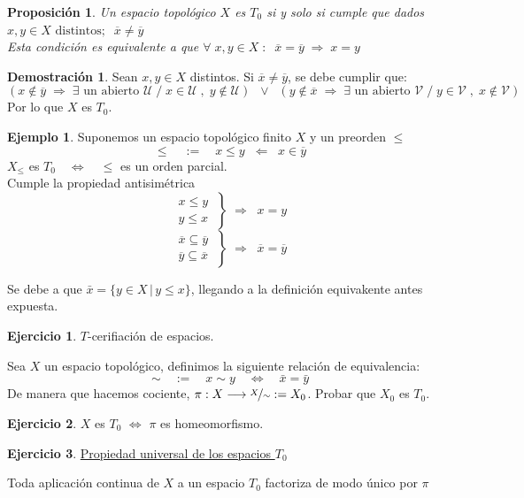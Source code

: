 \documentclass[12pt,twoside]{report}
\theoremstyle{azul}
\theoremstyle{azul2}
\theoremstyle{plain}
\newtheorem*{prop}{Proposición}
\theoremstyle{definition}
\newtheorem*{eje}{Ejemplo}
\newtheorem*{dem}{Demostración}
\newtheorem*{ejer}{Ejercicio}
\theoremstyle{remark}
\begin{document}
\begin{prop}
Un espacio topológico $X$ es $T_0$ si y solo si cumple que dados $x, y \in X \text{ distintos};\;\; \overline x \neq \overline y$\\
Esta condición es equivalente a que $\forall \; x, y \in X \; : \;\; \overline x = \overline y \; \Rightarrow \; x = y$
\end{prop}
\begin{dem}
Sean $x, y \in X$ distintos. Si $\overline{x} \neq \overline{y}$, se debe cumplir que:
$$(x \not\in \overline{y} \; \Rightarrow \; \exists \text{ un abierto } \mathcal{U}\; / \; x \in \mathcal{U} \; , \; y \nin \mathcal{U})\;\; \lor\;\; (y \nin \overline{x} \; \Rightarrow\; \exists \text{ un abierto } \mathcal{V}\; / \; y \in \mathcal{V} \; , \; x \not\in \mathcal{V})$$
Por lo que $X$ es $T_0$.
\end{dem}
\begin{eje}
Suponemos un espacio topológico finito $X$ y un preorden $\leq$
$$\leq \quad := \quad x \leq y \;\; \Leftarrow \; \; x \in \overline{y}$$
$X_{\leq}$ es $T_0 \quad \Leftrightarrow \quad \leq$ es un orden parcial.\vspace{5mm}\\
Cumple la propiedad antisimétrica
\vspace{-2mm}
$$\left. \begin{array}{c}
x \leq y \: \\
y \leq x \; \end{array} \right\} \; \Rightarrow \; \; x = y $$
$$ \left. \begin{array}{c}
\overline{x} \subseteq \overline{y}\; \\
\overline{y} \subseteq \overline{x}\; \end{array}\right\} \; \Rightarrow \; \; \overline{x} = \overline{y} $$

Se debe a que $\bar{x}=\{y \in X \, | \, y \leq x\}$, llegando a la definición equivakente antes expuesta.
\end{eje}
\begin{ejer} $T$-cerifiación de espacios.

Sea $X$ un espacio topológico, definimos la siguiente relación de equivalencia:
$$\sim \quad := \quad x \sim y \quad \iff \quad \bar{x} =\bar{y}$$
De manera que hacemos cociente, $\pi: X \longrightarrow \mathlarger{\nicefrac{X}{\sim}}:=X_0$. Probar que $X_0$ es $T_0$.
\end{ejer}
\begin{ejer}
$X$ es $T_0$ $\iff$ $\pi$ es homeomorfismo.
\end{ejer}
\begin{ejer} \underline{Propiedad universal de los espacios $T_0$}

Toda aplicación continua de $X$ a un espacio $T_0$ factoriza de modo único por $\pi$
\end{ejer}
\end{document}
